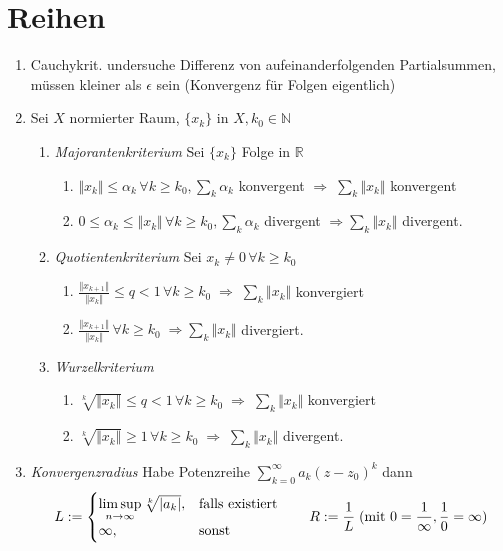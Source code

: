 \documentclass[ngerman,a4paper]{article}
\begin{document}
\section{Reihen}
\begin{enumerate}
	\item Cauchykrit. undersuche Differenz von aufeinanderfolgenden Partialsummen, müssen kleiner als $\epsilon$ sein (Konvergenz für Folgen eigentlich)
	\item Sei $X$ normierter Raum, $\{x_k\}$ in $X, k_0\in\mathbb{N}$
	\begin{enumerate}[label={\alph*)}]
		\item \emph{Majorantenkriterium} Sei $\{x_k\}$ Folge in $\mathbb{R}$
		\begin{enumerate}[label={\alph*)}]
			\item $\Vert x_k\Vert \le \alpha_k\,\forall k\ge k_0,\sum_k \alpha_k$ konvergent $\Rightarrow\;\sum_k \Vert x_k\Vert$ konvergent
			\item $0 \le \alpha_k \le \Vert x_k\Vert\,\forall k\ge k_0,\sum_k \alpha_k$ divergent $\Rightarrow\sum_k\Vert x_k\Vert$ divergent.
		\end{enumerate}
		\item \emph{Quotientenkriterium} Sei $x_k\neq 0\,\forall k\ge k_0$ 
		\begin{enumerate}[label={\alph*)}]
			\item $\frac{\Vert x_{k+1}\Vert}{\Vert x_k\Vert} \le q < 1\,\forall k\ge k_0 \;\Rightarrow\;\sum_k \Vert x_k\Vert$ konvergiert
			\item $\frac{\Vert x_{k+1}\Vert}{\Vert x_k\Vert}\,\forall k\ge k_0\;\Rightarrow \sum_k\Vert x_k\Vert$ divergiert.
		\end{enumerate}
		\item \emph{Wurzelkriterium}
		\begin{enumerate}[label={\alph*)}]
			\item $\sqrt[k]{\Vert x_k\Vert}\le q < 1\,\forall k\ge k_0\;\Rightarrow\;\sum_k\Vert x_k\Vert$ konvergiert
			\item $\sqrt[k]{\Vert x_k\Vert} \ge 1\,\forall k\ge k_0\;\Rightarrow\;\sum_k \Vert x_k\Vert$ divergent.
		\end{enumerate}
	\end{enumerate}
	\item \emph{Konvergenzradius} Habe Potenzreihe $\sum_{k=0}^\infty a_k(z-z_0)^k$ dann
	\begin{align}
		L:=\begin{cases} \limsup\limits_{n\rightarrow\infty} \sqrt[k]{|a_k|},&\text{falls existiert} \notag\\ \infty,&\text{sonst}\end{cases}\qquad R:=\frac{1}{L} \;(\text{mit }0 = \frac{1}{\infty}, \frac{1}{0} = \infty) \notag
	\end{align}
	$$
\end{enumerate}
\end{document}
